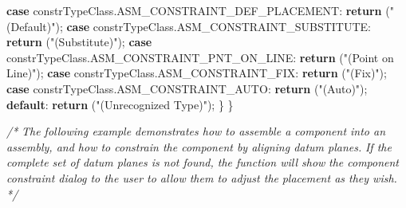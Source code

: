 \documentclass[]{article}
\newenvironment{Shaded}{}{}
\newcommand{\KeywordTok}[1]{\textcolor[rgb]{0.00,0.44,0.13}{\textbf{{#1}}}}
\newcommand{\StringTok}[1]{\textcolor[rgb]{0.25,0.44,0.63}{{#1}}}
\newcommand{\CommentTok}[1]{\textcolor[rgb]{0.38,0.63,0.69}{\textit{{#1}}}}
\newcommand{\OtherTok}[1]{\textcolor[rgb]{0.00,0.44,0.13}{{#1}}}
\newcommand{\FunctionTok}[1]{\textcolor[rgb]{0.02,0.16,0.49}{{#1}}}
\newcommand{\NormalTok}[1]{{#1}}
\begin{document}
\begin{Shaded}
\begin{Highlighting}[]
    \KeywordTok{case} \OtherTok{constrTypeClass}\NormalTok{.}\FunctionTok{ASM_CONSTRAINT_DEF_PLACEMENT}\NormalTok{:}
      \KeywordTok{return} \NormalTok{(}\StringTok{"(Default)"}\NormalTok{);     }
    \KeywordTok{case} \OtherTok{constrTypeClass}\NormalTok{.}\FunctionTok{ASM_CONSTRAINT_SUBSTITUTE}\NormalTok{:}
      \KeywordTok{return} \NormalTok{(}\StringTok{"(Substitute)"}\NormalTok{);      }
    \KeywordTok{case} \OtherTok{constrTypeClass}\NormalTok{.}\FunctionTok{ASM_CONSTRAINT_PNT_ON_LINE}\NormalTok{:}
      \KeywordTok{return} \NormalTok{(}\StringTok{"(Point on Line)"}\NormalTok{);       }
    \KeywordTok{case} \OtherTok{constrTypeClass}\NormalTok{.}\FunctionTok{ASM_CONSTRAINT_FIX}\NormalTok{:}
      \KeywordTok{return} \NormalTok{(}\StringTok{"(Fix)"}\NormalTok{);     }
    \KeywordTok{case} \OtherTok{constrTypeClass}\NormalTok{.}\FunctionTok{ASM_CONSTRAINT_AUTO}\NormalTok{:}
      \KeywordTok{return} \NormalTok{(}\StringTok{"(Auto)"}\NormalTok{);        }
    \KeywordTok{default}\NormalTok{:}
      \KeywordTok{return} \NormalTok{(}\StringTok{"(Unrecognized Type)"}\NormalTok{);       }
    \NormalTok{\}}
\NormalTok{\}}

\CommentTok{/* }
\CommentTok{   The following example demonstrates how to assemble a component into an}
\CommentTok{   assembly, and how to constrain the component by aligning datum planes.}
\CommentTok{   If the complete set of datum planes is not found, the function will show}
\CommentTok{   the component constraint dialog to the user to allow them to adjust the}
\CommentTok{   placement as they wish.}
\CommentTok{*/}


\end{Highlighting}
\end{Shaded}
\end{document}
